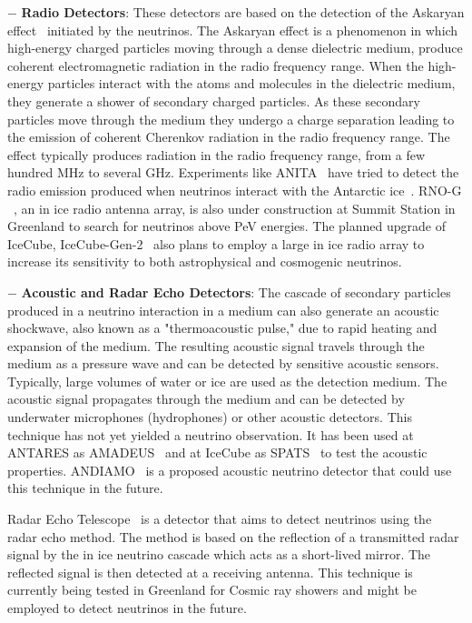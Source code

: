 \begin{description}
  \item $-$ \textbf{Radio Detectors}: These detectors are based on the detection of the Askaryan effect~\cite{Askaryan:1961pfb,PhysRevD.84.103003} initiated by the neutrinos. The Askaryan effect is a phenomenon in which high-energy charged particles moving through a dense dielectric medium, produce coherent electromagnetic radiation in the radio frequency range.  When the high-energy particles interact with the atoms and molecules in the dielectric medium, they generate a shower of secondary charged particles. As these secondary particles move through the medium they undergo a charge separation leading to the emission of coherent Cherenkov radiation in the radio frequency range. The effect typically produces radiation in the radio frequency range, from a few hundred \gls{MHz} to several \gls{GHz}. Experiments like ANITA~\cite{ANITA:2008mzi} have tried to detect the radio emission produced when neutrinos interact with the Antarctic ice~\cite{Schoorlemmer_2016}. RNO-G ~\cite{Aguilar_2021}, an in ice radio antenna array, is also under construction at Summit Station in Greenland to search for neutrinos above PeV energies. The planned upgrade of IceCube, IceCube-Gen-2~\cite{Aartsen_2021_Gen-2} also plans to employ a large in ice radio array to increase its sensitivity to both astrophysical and cosmogenic neutrinos. 
  
  \item $-$ \textbf{Acoustic and Radar Echo Detectors}:  The cascade of secondary particles produced in a neutrino interaction in a medium can also generate an acoustic shockwave, also known as a "thermoacoustic pulse," due to rapid heating and expansion of the medium. The resulting acoustic signal travels through the medium as a pressure wave and can be detected by sensitive acoustic sensors. Typically, large volumes of water or ice are used as the detection medium. The acoustic signal propagates through the medium and can be detected by underwater microphones (hydrophones) or other acoustic detectors. This technique has not yet yielded a neutrino observation. It has been used at ANTARES as AMADEUS~\cite{LAHMANN2012S216} and at IceCube as SPATS~\cite{Karg_2012} to test the acoustic properties. ANDIAMO~\cite{Marinelli_2022} is a proposed acoustic neutrino detector that could use this technique in the future.
  
  Radar Echo Telescope~\cite{Prohira_2021} is a detector that aims to detect neutrinos using the radar echo method. The method is based on the reflection of a transmitted radar signal by the in ice neutrino cascade which acts as a short-lived mirror. The reflected signal is then detected at a receiving antenna. This technique is currently being tested in Greenland for Cosmic ray showers and might be employed to detect neutrinos in the future.


\end{description}
